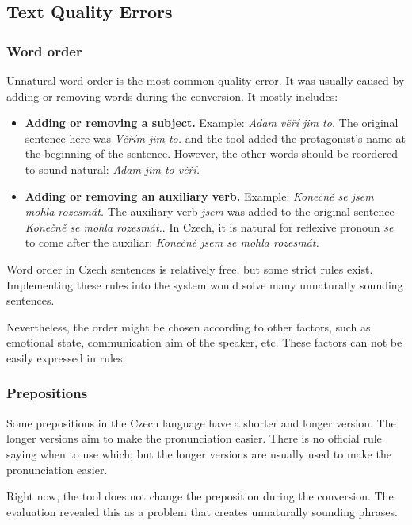 \subsection{Text Quality Errors}

\subsubsection{Word order}

Unnatural word order is the most common quality error. It was usually caused by adding or removing words during the conversion. It mostly includes:

\begin{itemize}
	\item \textbf{Adding or removing a subject.} Example: \emph{Adam věří jim to.} The original sentence here was \emph{Věřím jim to.} and the tool added the protagonist's name at the beginning of the sentence. However, the other words should be reordered to sound natural: \emph{Adam jim to věří.}
	\item \textbf{Adding or removing an auxiliary verb.} Example: \emph{Konečně se jsem mohla rozesmát.} The auxiliary verb \emph{jsem} was added to the original sentence \emph{Konečně se mohla rozesmát.}. In Czech, it is natural for reflexive pronoun \emph{se} to come after the auxiliar: \emph{Konečně jsem se mohla rozesmát.}
\end{itemize}

Word order in Czech sentences is relatively free, but some strict rules exist. Implementing these rules into the system would solve many unnaturally sounding sentences.

Nevertheless, the order might be chosen according to other factors, such as emotional state, communication aim of the speaker, etc. These factors can not be easily expressed in rules.


\subsubsection{Prepositions}

Some prepositions in the Czech language have a shorter and longer version. The longer versions aim to make the pronunciation easier. There is no official rule saying when to use which, but the longer versions are usually used to make the pronunciation easier.

Right now, the tool does not change the preposition during the conversion. The evaluation revealed this as a problem that creates unnaturally sounding phrases.

